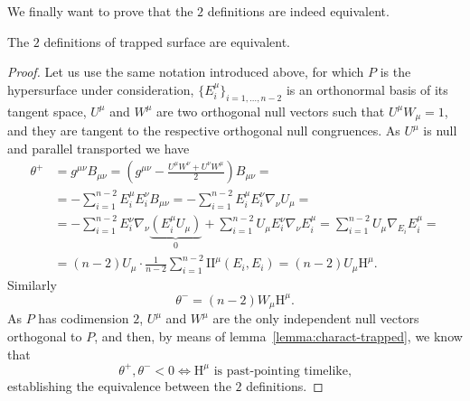 We finally want to prove that the \(2\) definitions are indeed equivalent.
\begin{lemma}
	\label{lemma:equiv-trapped}
	The \(2\) definitions of trapped surface are equivalent.
\end{lemma}
\begin{proof}
	Let us use the same notation introduced above, for which \(P\) is the hypersurface under consideration, \(\{E_i^{\mu}\}_{i = 1, \ldots, n - 2}\) is an orthonormal basis of its tangent space, \(U^{\mu}\) and \(W^{\mu}\) are two orthogonal null vectors such that \(U^{\mu}W_{\mu} = 1\), and they are tangent to the respective orthogonal null congruences. As \(U^{\mu}\) is null and parallel transported we have
	\begin{align*}
		\theta^+ &= g^{\mu\nu}B_{\mu\nu} = \left(g^{\mu\nu} - \frac{U^{\mu}W^{\nu} + U^{\nu}W^{\mu}}{2}\right)B_{\mu\nu} =\\
		&= - \sum_{i=1}^{n - 2}E_i^{\mu}E_i^{\nu}B_{\mu\nu} = - \sum_{i=1}^{n - 2}E_i^{\mu}E_i^{\nu}\nabla_{\nu}U_{\mu} = \\
		& = -  \sum_{i=1}^{n - 2}E_i^{\nu}\nabla_{\nu}\underbrace{\left(E_i^{\mu}U_{\mu}\right)}_{0} +  \sum_{i=1}^{n - 2}U_{\mu}E_i^{\nu}\nabla_{\nu}E_i^{\mu} = \sum_{i=1}^{n - 2}U_{\mu}\nabla_{E_i}E_i^{\mu} = \\
		& = (n - 2) U_{\mu} \cdot \frac{1}{n - 2}\sum_{i=1}^{n - 2}\mathrm{I\!I}^{\mu} \left(E_i, E_i\right) = (n - 2) U_{\mu}\mathrm{H}^{\mu}.
	\end{align*}
	Similarly
	\[
	\theta^- = (n - 2) W_{\mu}\mathrm{H}^{\mu}.
	\]
	As \(P\) has codimension \(2\), \(U^{\mu}\) and \(W^{\mu}\) are the only independent null vectors orthogonal to \(P\), and then, by means of lemma~\ref{lemma:charact-trapped}, we know that 
	\[
	\theta^+ , \theta^- < 0 \iff \mathrm{H}^{\mu} \text{ is past-pointing timelike,}
	\]
	establishing the equivalence between the \(2\) definitions.
\end{proof}

